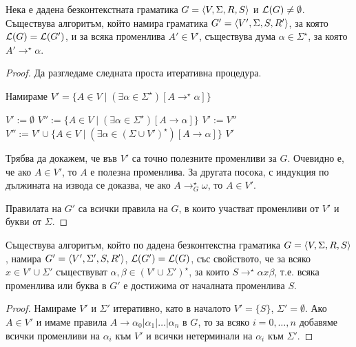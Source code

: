 \begin{lemma}
  \label{lem:useless1}
  Нека е дадена безконтекстната граматика $G = \langle{V,\Sigma,R,S}\rangle$ и $\mathcal{L}(G) \neq \emptyset$.
  Съществува алгоритъм, който намира граматика $G' = \langle{V',\Sigma,S,R'}\rangle$, за която 
  $\mathcal{L}(G) = \mathcal{L}(G')$, и за всяка променлива $A' \in V'$, съществува дума $\alpha \in \Sigma^\star$,
  за която $A' \to^\star \alpha$.
\end{lemma}
\begin{proof}
  Да разгледаме следната проста итеративна процедура.
  \begin{algorithm}[H]
    \caption{Намираме $V' = \{A \in V\mid (\exists \alpha \in \Sigma^\star)[A \to^\star \alpha]\}$}
    \label{alg:useless}
    \begin{algorithmic}[1]
      \State $V' := \emptyset$
      \State $V'' := \{A \in V \mid (\exists \alpha \in \Sigma^\star)[A \to \alpha]\}$
      \State $V' := V''$
      \State $V'' := V' \cup \{A \in V \mid (\exists \alpha \in (\Sigma \cup V')^\star)[A \to \alpha]\}$
      \EndWhile
      \State \Return $V'$
    \end{algorithmic}
  \end{algorithm}
  Трябва да докажем, че във $V'$ са точно полезните променливи за $G$.
  Очевидно е, че ако $A \in V'$, то $A$ е полезна променлива.
  За другата посока, с индукция по дължината на извода се доказва, че ако $A \to^\star_G \omega$,
  то $A \in V'$.
  
  Правилата на $G'$ са всички правила на $G$, в които участват променливи от $V'$ и букви от $\Sigma$.
\end{proof}

\begin{lemma}
  \label{lem:useless2}
  Съществува алгоритъм, който по дадена безконтекстна граматика $G = \langle{V,\Sigma,R,S}\rangle$, намира $G' = \langle{V',\Sigma',S,R'}\rangle$, $\mathcal{L}(G') = \mathcal{L}(G)$,
  със свойството, че за всяко $x \in V' \cup \Sigma'$ съществуват $\alpha, \beta \in (V'\cup\Sigma')^\star$,
  за които $S \to^\star \alpha x \beta$,
  т.е. всяка променлива или буква в $G'$ е достижима от началната променлива $S$.
\end{lemma}
\begin{proof}
  Намираме $V'$ и $\Sigma'$ итеративно, като в началото $V' = \{S\}$, $\Sigma' = \emptyset$.
  Ако $A \in V'$ и имаме правила $A \to \alpha_0 | \alpha_1 | \dots | \alpha_n$ в $G$,
  то за всяко $i = 0,\dots,n$ добавяме всички променливи на $\alpha_i$ към $V'$ и всички нетерминали на $\alpha_i$ към $\Sigma'$.
\end{proof}

